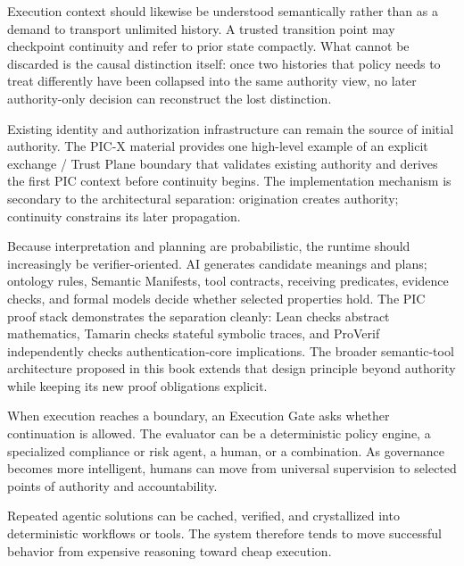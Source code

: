 \documentclass[10pt,oneside,openany]{book}
\begin{document}
Execution context should likewise be understood semantically rather than as a demand to transport unlimited history. A trusted transition point may checkpoint continuity and refer to prior state compactly. What cannot be discarded is the causal distinction itself: once two histories that policy needs to treat differently have been collapsed into the same authority view, no later authority-only decision can reconstruct the lost distinction.


Existing identity and authorization infrastructure can remain the source of initial authority. The PIC-X material provides one high-level example of an explicit exchange / Trust Plane boundary that validates existing authority and derives the first PIC context before continuity begins. The implementation mechanism is secondary to the architectural separation: origination creates authority; continuity constrains its later propagation.

Because interpretation and planning are probabilistic, the runtime should increasingly be verifier-oriented. AI generates candidate meanings and plans; ontology rules, Semantic Manifests, tool contracts, receiving predicates, evidence checks, and formal models decide whether selected properties hold. The PIC proof stack demonstrates the separation cleanly: Lean checks abstract mathematics, Tamarin checks stateful symbolic traces, and ProVerif independently checks authentication-core implications. The broader semantic-tool architecture proposed in this book extends that design principle beyond authority while keeping its new proof obligations explicit.

When execution reaches a boundary, an Execution Gate asks whether continuation is allowed. The evaluator can be a deterministic policy engine, a specialized compliance or risk agent, a human, or a combination. As governance becomes more intelligent, humans can move from universal supervision to selected points of authority and accountability.

Repeated agentic solutions can be cached, verified, and crystallized into deterministic workflows or tools. The system therefore tends to move successful behavior from expensive reasoning toward cheap execution.
\end{document}
